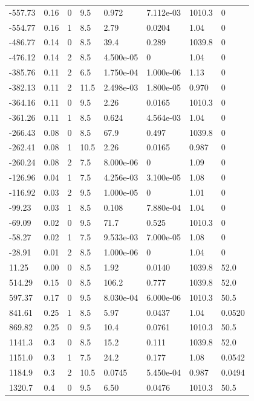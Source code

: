 \documentclass[preview]{standalone}
\begin{document}
{{\begin{tabular}{L{1.2cm}C{1.2cm} C{0.3cm}C{0.5cm} C{1.4cm}C{1.4cm} C{1.4cm}C{1.4cm}}
  -557.73  &  0.16  & 0     & 9.5 &  0.972  & 7.112e-03  & 1010.3 &  0   \\ 
  -554.77  &  0.16  & 1     & 8.5 &  2.79  & 0.0204  & 1.04 &  0   \\ 
  -486.77  &  0.14  & 0     & 8.5 &  39.4  & 0.289  & 1039.8 &  0   \\ 
  -476.12  &  0.14  & 2     & 8.5 &  4.500e-05  & 0  & 1.04 &  0   \\ 
  -385.76  &  0.11  & 2     & 6.5 &  1.750e-04  & 1.000e-06  & 1.13 &  0   \\ 
  -382.13  &  0.11  & 2     & 11.5 &  2.498e-03  & 1.800e-05  & 0.970 &  0   \\ 
  -364.16  &  0.11  & 0     & 9.5 &  2.26  & 0.0165  & 1010.3 &  0   \\ 
  -361.26  &  0.11  & 1     & 8.5 &  0.624  & 4.564e-03  & 1.04 &  0   \\ 
  -266.43  &  0.08  & 0     & 8.5 &  67.9  & 0.497  & 1039.8 &  0   \\ 
  -262.41  &  0.08  & 1     & 10.5 &  2.26  & 0.0165  & 0.987 &  0   \\ 
  -260.24  &  0.08  & 2     & 7.5 &  8.000e-06  & 0  & 1.09 &  0   \\ 
  -126.96  &  0.04  & 1     & 7.5 &  4.256e-03  & 3.100e-05  & 1.08 &  0   \\ 
  -116.92  &  0.03  & 2     & 9.5 &  1.000e-05  & 0  & 1.01 &  0   \\ 
  -99.23  &  0.03  & 1     & 8.5 &  0.108  & 7.880e-04  & 1.04 &  0   \\ 
  -69.09  &  0.02  & 0     & 9.5 &  71.7  & 0.525  & 1010.3 &  0   \\ 
  -58.27  &  0.02  & 1     & 7.5 &  9.533e-03  & 7.000e-05  & 1.08 &  0   \\ 
  -28.91  &  0.01  & 2     & 8.5 &  1.000e-06  & 0  & 1.04 &  0   \\ 
  11.25  &  0.00  & 0     & 8.5 &  1.92  & 0.0140  & 1039.8 &  52.0   \\ 
  514.29  &  0.15  & 0     & 8.5 &  106.2  & 0.777  & 1039.8 &  52.0   \\ 
  597.37  &  0.17  & 0     & 9.5 &  8.030e-04  & 6.000e-06  & 1010.3 &  50.5   \\ 
  841.61  &  0.25  & 1     & 8.5 &  5.97  & 0.0437  & 1.04 &  0.0520   \\ 
  869.82  &  0.25  & 0     & 9.5 &  10.4  & 0.0761  & 1010.3 &  50.5   \\ 
  1141.3  &   0.3  & 0     & 8.5 &  15.2  & 0.111  & 1039.8 &  52.0   \\ 
  1151.0  &   0.3  & 1     & 7.5 &  24.2  & 0.177  & 1.08 &  0.0542   \\ 
  1184.9  &   0.3  & 2     & 10.5 &  0.0745  & 5.450e-04  & 0.987 &  0.0494   \\ 
  1320.7  &   0.4  & 0     & 9.5 &  6.50  & 0.0476  & 1010.3 &  50.5   \\ 
\hline 
\end{tabular} 

}}
\end{document}

